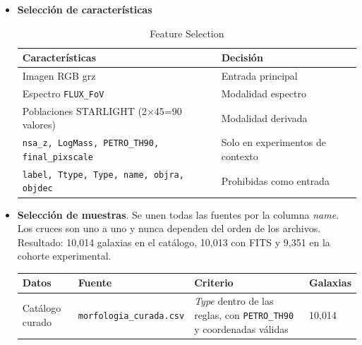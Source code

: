 \documentclass[12pt]{article}
\begin{document}
\begin{itemize}
    \item \textbf{Selección de características}

    \begin{table}[H]
        \centering
        \scriptsize
        \begin{tabular}{|p{}|p{}|} \hline
        \textbf{Características} & \textbf{Decisión} \\ \hline

        Imagen RGB grz &
        Entrada principal \\ \hline

        Espectro \texttt{FLUX\_FoV} &
        Modalidad espectro \\ \hline

        Poblaciones STARLIGHT (2×45=90 valores) &
        Modalidad derivada \\ \hline

        \texttt{nsa\_z, LogMass, PETRO\_TH90, final\_pixscale} &
        Solo en experimentos de contexto \\ \hline

        \texttt{label, Ttype, Type, name, objra, objdec} &
        Prohibidas como entrada \\ \hline

        \end{tabular}
        \caption{Feature Selection}
        \label{aplicacion}
    \end{table}

    \item \textbf{Selección de muestras}. Se unen todas las fuentes por la columna \textit{name}. Los cruces son uno a uno y nunca dependen del orden de los archivos. Resultado: 10,014 galaxias en el catálogo, 10,013 con FITS y 9,351 en la cohorte experimental.
    
    \begin{table}[H]
        \centering
        \scriptsize
        \begin{tabular}{|p{}|p{}|p{}|p{}|}
        \hline
        \textbf{Datos} & \textbf{Fuente} & \textbf{Criterio} & \textbf{Galaxias} \\
        \hline

        Catálogo curado &
        \texttt{morfologia\_curada.csv} &
        \textit{Type} dentro de las reglas, con \texttt{PETRO\_TH90} y coordenadas válidas &
        10,014 \\ \hline


\end{tabular}
\end{table}
\end{itemize}
\end{document}
